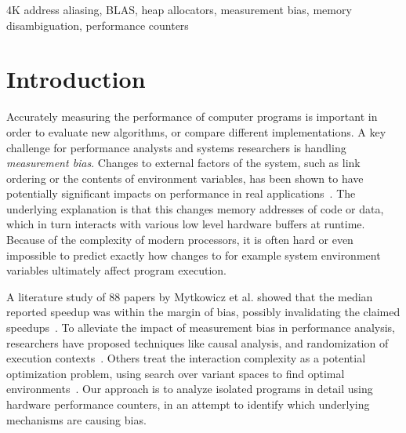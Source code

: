 \documentclass[10pt, conference, compsocconf]{IEEEtran}
\begin{document}

\begin{IEEEkeywords}
4K address aliasing, BLAS, heap allocators, measurement bias, memory disambiguation, performance counters
\end{IEEEkeywords}








\section{Introduction}
Accurately measuring the performance of computer programs is important in order to evaluate new algorithms, or compare different implementations.
A key challenge for performance analysts and systems researchers is handling \emph{measurement bias}.
Changes to external factors of the system, such as link ordering or the contents of environment variables, has been shown to have potentially significant impacts on performance in real applications~\cite{Mytkowicz:2009:WrongData}.
The underlying explanation is that this changes memory addresses of code or data, which in turn interacts with various low level hardware buffers at runtime.
Because of the complexity of modern processors, it is often hard or even impossible to predict exactly how changes to for example system environment variables ultimately affect program execution.


A literature study of 88 papers by Mytkowicz et al. showed that the median reported speedup was within the margin of bias, possibly invalidating the claimed speedups~\cite{Mytkowicz:2008:OE&MB}.
To alleviate the impact of measurement bias in performance analysis, researchers have proposed techniques like causal analysis, and randomization of execution contexts~\cite{Mytkowicz:2008:OE&MB}.
Others treat the interaction complexity as a potential optimization problem, using search over variant spaces to find optimal environments~\cite{Knights:2009:BlindOpt}.
Our approach is to analyze isolated programs in detail using hardware performance counters, in an attempt to identify which underlying mechanisms are causing bias.
\end{document}
